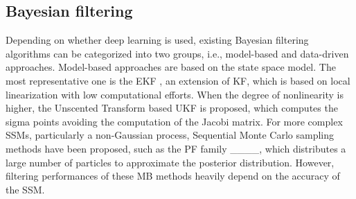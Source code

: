 

\subsection{Bayesian filtering}

Depending on whether deep learning is used, existing Bayesian filtering algorithms can be categorized into two groups, i.e., model-based and data-driven approaches.
Model-based approaches are based on the state space model. The most representative one is the EKF \cite {4982682, 1098671}, an extension of KF, which is based on local linearization with low computational efforts.
When the degree of nonlinearity is higher, the Unscented Transform based UKF \cite {Julier1997NewEO} is proposed, which computes the sigma points avoiding the computation of the Jacobi matrix.
For more complex SSMs, particularly a non-Gaussian process, Sequential Monte Carlo sampling methods have been proposed, such as the PF family  ____, which distributes a large number of particles to approximate the posterior distribution.
However, filtering performances of these MB methods heavily depend on the accuracy of the SSM.

